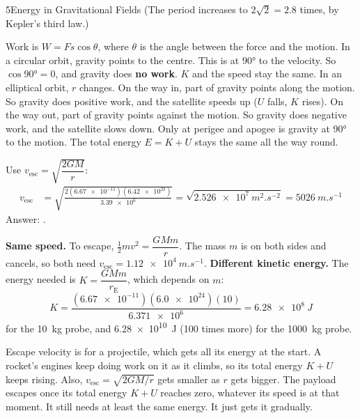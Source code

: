 \begin{chapteranswers}{5}{Energy in Gravitational Fields}
        (The period increases to $2\sqrt{2} = 2.8$ times, by Kepler's third law.)
  \item Work is $W = Fs\cos\theta$, where $\theta$ is the angle between the force
        and the motion. In a circular orbit, gravity points to the centre. This
        is at \ang{90} to the velocity. So $\cos\ang{90} = 0$, and gravity does
        \textbf{no work}. $K$ and the speed stay the same.
        In an elliptical orbit, $r$ changes. On the way in, part of gravity
        points along the motion. So gravity does positive work, and the
        satellite speeds up ($U$ falls, $K$ rises). On the way out, part of
        gravity points against the motion. So gravity does negative work, and
        the satellite slows down. Only at perigee and apogee is gravity at
        \ang{90} to the motion. The total energy $E = K + U$ stays the same all
        the way round.
  \item Use $v_\mathrm{esc} = \sqrt{\dfrac{2GM}{r}}$:
        \begin{align*}
          v_\mathrm{esc} &= \sqrt{\frac{2(\num{6.67e-11})(\num{6.42e23})}{\num{3.39e6}}}
            = \sqrt{\qty{2.526e7}{m^2.s^{-2}}} = \qty{5026}{m.s^{-1}}
        \end{align*}
        Answer: .
  \item \textbf{Same speed.} To escape, $\tfrac{1}{2}mv^2 = \dfrac{GMm}{r}$. The
        mass $m$ is on both sides and cancels, so both need
        $v_\mathrm{esc} = \qty{1.12e4}{m.s^{-1}}$.
        \textbf{Different kinetic energy.} The energy needed is
        $K = \dfrac{GMm}{r_\mathrm{E}}$, which depends on $m$:
        \[ K = \frac{(\num{6.67e-11})(\num{6.0e24})(10)}{\num{6.371e6}} = \qty{6.28e8}{J} \]
        for the \qty{10}{kg} probe, and \qty{6.28e10}{J} (100 times more) for the
        \qty{1000}{kg} probe.
  \item Escape velocity is for a projectile, which gets all its energy at the
        start. A rocket's engines keep doing work on it as it climbs, so its
        total energy $K + U$ keeps rising. Also, $v_\mathrm{esc} = \sqrt{2GM/r}$
        gets smaller as $r$ gets bigger. The payload escapes once its total
        energy $K + U$ reaches zero, whatever its speed is at that moment. It
        still needs at least the same energy. It just gets it gradually.
        \begin{markingcriteria}
\end{markingcriteria}
\end{chapteranswers}
